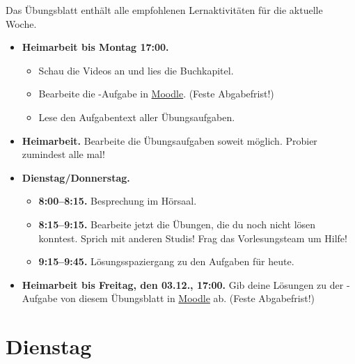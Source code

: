 \documentclass{uebung_cs}
\begin{document}
Das Übungsblatt enthält alle empfohlenen Lernaktivitäten für die aktuelle Woche.

\begin{itemize}
\item \textbf{Heimarbeit bis Montag 17:00.}
    \begin{itemize}
    \item 
    Schau die Videos an und lies die Buchkapitel.
    \item Bearbeite die -Aufgabe in \href{https://moodle.studiumdigitale.uni-frankfurt.de/moodle/course/view.php?id=2241}{Moodle}. (Feste Abgabefrist!)
    \item Lese den Aufgabentext aller Übungsaufgaben.
    \end{itemize}
\item \textbf{Heimarbeit.} Bearbeite die Übungsaufgaben soweit möglich. Probier zumindest alle mal!
\item \textbf{Dienstag/Donnerstag.}
\begin{itemize}
    \item \textbf{8:00--8:15.} Besprechung im Hörsaal.
    \item \textbf{8:15--9:15.} Bearbeite jetzt die Übungen, die du noch nicht lösen konntest. Sprich mit anderen Studis! Frag das Vorlesungsteam um Hilfe!
    \item \textbf{9:15--9:45.} Lösungsspaziergang zu den Aufgaben für heute.
\end{itemize}

\item \textbf{Heimarbeit bis Freitag, den 03.12., 17:00.} Gib deine Lösungen zu der -Aufgabe von diesem Übungsblatt in \href{https://moodle.studiumdigitale.uni-frankfurt.de/moodle/course/view.php?id=2241}{Moodle} ab. (Feste Abgabefrist!)
\end{itemize}

\section*{Dienstag}
\end{document}
